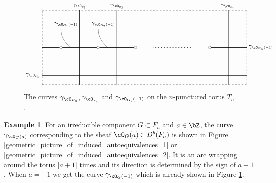 \documentclass{amsart}
\numberwithin{equation}{section}
\theoremstyle{plain}
\theoremstyle{definition}
\newtheorem{example}[theorem]{Example}
\begin{document}
\begin{figure}[h]
    \centering
    \begin{displaymath}
        \begin{tikzpicture}[scale=1.2]
            \draw[dashed] (0,0)--(11,0);
            \draw[dashed] (0,0)--(0,4);
            \draw[dashed] (0,4)--(11,4);
            \draw[dashed] (11,4)--(11,0);

            \draw[thick] (0, 2)--(1, 2);
            \draw[thick] (1, 2)--(3, 2);
            \draw[thick] (3, 2)--(5, 2);
            \draw[thick] (9, 2)--(11, 2);

            \draw[thick] (0, 0.5)--(11, 0.5);

            \draw[thick] (2, 0)--(2, 4);
            \draw[thick] (4, 0)--(4, 4);
            \draw[thick] (10, 0)--(10, 4);

            \draw[dotted, thick] (5+1, 2)--(9-1, 2);
            \foreach \u in {1, 3, 5, 9}
                {
                    \filldraw[white] (\u, 2) circle (2pt);
                    \draw[black] (\u, 2) circle (2pt);
                }

            \draw(0, 0.5) node[left]{$\gamma_{\cO_{F_n}}$};
            \draw(2, 4) node[above]{$\gamma_{\cO_{x_1}}$};
            \draw(4, 4) node[above]{$\gamma_{\cO_{x_2}}$};
            \draw(10, 4) node[above]{$\gamma_{\cO_{x_n}}$};

            \draw(2, 3) node[above left]{$\gamma_{\cO_{G_1}(-1)}$};
            \draw(1, 3) to[out=-90,in=135](1.5, 2);
            \draw(4, 3) node[above left]{$\gamma_{\cO_{G_2}(-1)}$};
            \draw(3, 3) to[out=-90,in=135](3.5, 2);

            \draw(11, 2) node[right]{$\gamma_{\cO_{G_n}(-1)}$};

        \end{tikzpicture}
    \end{displaymath}
    \caption{The curves $\gamma_{\cO_{F_n}}, \gamma_{\cO_{x_i}}$ and $\gamma_{\cO_{G_i}(-1)}$ on the $n$-punctured torus $T_n$.}
    \label{fig:corresponding-curves-via-hms}
\end{figure}

\begin{example}
    For an irreducible component $G \subset F_n$ and $a \in \bZ$, the curve $\gamma_{\cO_G(a)}$ corresponding to the sheaf $\cO_G(a) \in D^b(F_n)$ is shown in Figure \ref{geometric_picture_of_induced_autoequivalences_1} or \ref{geometric_picture_of_induced_autoequivalences_2}.
    It is an arc wrapping around the torus $|a + 1|$ times and its direction is determined by the sign of $a + 1$.
    When $a = -1$ we get the curve $\gamma_{\cO_G(-1)}$ which is already shown in Figure \ref{fig:corresponding-curves-via-hms}.
\end{example}
\end{document}
